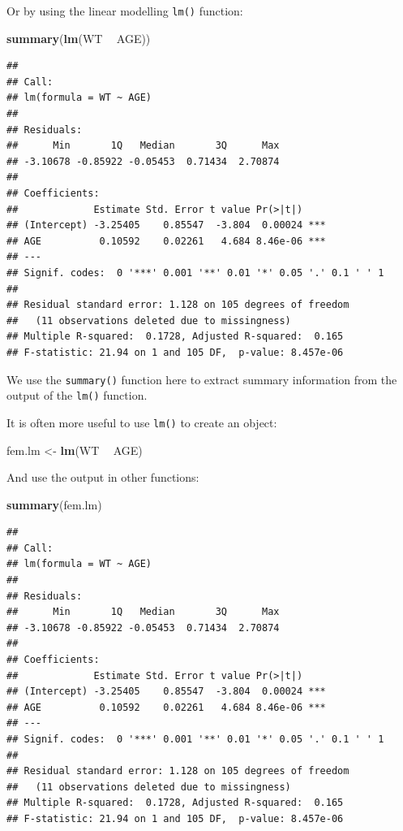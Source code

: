 \documentclass[12pt,]{book}
\newenvironment{Shaded}{\begin{snugshade}}{\end{snugshade}}
\newcommand{\KeywordTok}[1]{\textcolor[rgb]{0.13,0.29,0.53}{\textbf{#1}}}
\newcommand{\StringTok}[1]{\textcolor[rgb]{0.31,0.60,0.02}{#1}}
\newcommand{\OperatorTok}[1]{\textcolor[rgb]{0.81,0.36,0.00}{\textbf{#1}}}
\newcommand{\NormalTok}[1]{#1}
\theoremstyle{definition}
\theoremstyle{definition}
\theoremstyle{definition}
\theoremstyle{remark}
\begin{document}
Or by using the linear modelling \texttt{lm()} function:

\begin{Shaded}
\begin{Highlighting}[]
\KeywordTok{summary}\NormalTok{(}\KeywordTok{lm}\NormalTok{(WT }\OperatorTok{~}\StringTok{ }\NormalTok{AGE))}
\end{Highlighting}
\end{Shaded}

\begin{verbatim}
## 
## Call:
## lm(formula = WT ~ AGE)
## 
## Residuals:
##      Min       1Q   Median       3Q      Max 
## -3.10678 -0.85922 -0.05453  0.71434  2.70874 
## 
## Coefficients:
##             Estimate Std. Error t value Pr(>|t|)    
## (Intercept) -3.25405    0.85547  -3.804  0.00024 ***
## AGE          0.10592    0.02261   4.684 8.46e-06 ***
## ---
## Signif. codes:  0 '***' 0.001 '**' 0.01 '*' 0.05 '.' 0.1 ' ' 1
## 
## Residual standard error: 1.128 on 105 degrees of freedom
##   (11 observations deleted due to missingness)
## Multiple R-squared:  0.1728, Adjusted R-squared:  0.165 
## F-statistic: 21.94 on 1 and 105 DF,  p-value: 8.457e-06
\end{verbatim}

We use the \texttt{summary()} function here to extract summary
information from the output of the \texttt{lm()} function.

It is often more useful to use \texttt{lm()} to create an object:

\begin{Shaded}
\begin{Highlighting}[]
\NormalTok{fem.lm <-}\StringTok{ }\KeywordTok{lm}\NormalTok{(WT }\OperatorTok{~}\StringTok{ }\NormalTok{AGE)}
\end{Highlighting}
\end{Shaded}

And use the output in other functions:

\begin{Shaded}
\begin{Highlighting}[]
\KeywordTok{summary}\NormalTok{(fem.lm)}
\end{Highlighting}
\end{Shaded}

\begin{verbatim}
## 
## Call:
## lm(formula = WT ~ AGE)
## 
## Residuals:
##      Min       1Q   Median       3Q      Max 
## -3.10678 -0.85922 -0.05453  0.71434  2.70874 
## 
## Coefficients:
##             Estimate Std. Error t value Pr(>|t|)    
## (Intercept) -3.25405    0.85547  -3.804  0.00024 ***
## AGE          0.10592    0.02261   4.684 8.46e-06 ***
## ---
## Signif. codes:  0 '***' 0.001 '**' 0.01 '*' 0.05 '.' 0.1 ' ' 1
## 
## Residual standard error: 1.128 on 105 degrees of freedom
##   (11 observations deleted due to missingness)
## Multiple R-squared:  0.1728, Adjusted R-squared:  0.165 
## F-statistic: 21.94 on 1 and 105 DF,  p-value: 8.457e-06
\end{verbatim}
\end{document}
